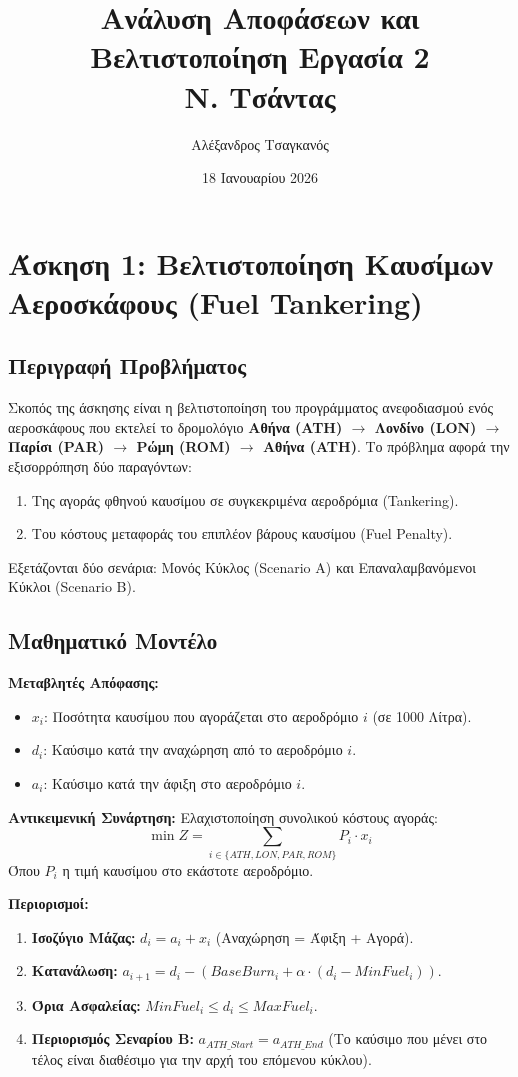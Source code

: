 \documentclass[12pt, a4paper]{article}
\title{\textbf{ Ανάλυση Αποφάσεων και Βελτιστοποίηση Εργασία 2}\\ \Large  Ν. Τσάντας}
\author{Αλέξανδρος Τσαγκανός}
\date{18 Ιανουαρίου 2026}
\begin{document}
\maketitle

\newpage


\section{Άσκηση 1: Βελτιστοποίηση Καυσίμων Αεροσκάφους (Fuel Tankering)}

\subsection{Περιγραφή Προβλήματος}
Σκοπός της άσκησης είναι η βελτιστοποίηση του προγράμματος ανεφοδιασμού ενός αεροσκάφους που εκτελεί το δρομολόγιο \textbf{Αθήνα (ATH) $\to$ Λονδίνο (LON) $\to$ Παρίσι (PAR) $\to$ Ρώμη (ROM) $\to$ Αθήνα (ATH)}.
Το πρόβλημα αφορά την εξισορρόπηση δύο παραγόντων:
\begin{enumerate}
    \item Της αγοράς φθηνού καυσίμου σε συγκεκριμένα αεροδρόμια (Tankering).
    \item Του κόστους μεταφοράς του επιπλέον βάρους καυσίμου (Fuel Penalty).
\end{enumerate}
Εξετάζονται δύο σενάρια: Μονός Κύκλος (Scenario A) και Επαναλαμβανόμενοι Κύκλοι (Scenario B).

\subsection{Μαθηματικό Μοντέλο}

\textbf{Μεταβλητές Απόφασης:}
\begin{itemize}
    \item $x_i$: Ποσότητα καυσίμου που αγοράζεται στο αεροδρόμιο $i$ (σε 1000 Λίτρα).
    \item $d_i$: Καύσιμο κατά την αναχώρηση από το αεροδρόμιο $i$.
    \item $a_i$: Καύσιμο κατά την άφιξη στο αεροδρόμιο $i$.
\end{itemize}

\textbf{Αντικειμενική Συνάρτηση:}
Ελαχιστοποίηση συνολικού κόστους αγοράς:
$$ \min Z = \sum_{i \in \{ATH, LON, PAR, ROM\}} P_i \cdot x_i $$
Όπου $P_i$ η τιμή καυσίμου στο εκάστοτε αεροδρόμιο.

\textbf{Περιορισμοί:}
\begin{enumerate}
    \item \textbf{Ισοζύγιο Μάζας:} $d_i = a_i + x_i$ (Αναχώρηση = Άφιξη + Αγορά).
    \item \textbf{Κατανάλωση:} $a_{i+1} = d_i - (BaseBurn_i + \alpha \cdot (d_i - MinFuel_i))$.
    \item \textbf{Όρια Ασφαλείας:} $MinFuel_i \le d_i \le MaxFuel_i$.
    \item \textbf{Περιορισμός Σεναρίου Β:} $a_{ATH\_Start} = a_{ATH\_End}$ (Το καύσιμο που μένει στο τέλος είναι διαθέσιμο για την αρχή του επόμενου κύκλου).
\end{enumerate}
\end{document}
